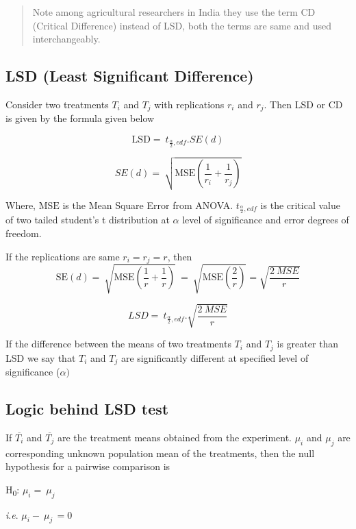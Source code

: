 \documentclass[
]{book}
\begin{document}
\begin{quote}
Note among agricultural researchers in India they use the term CD (Critical Difference) instead of LSD, both the terms are same and used interchangeably.
\end{quote}

\hypertarget{lsd-least-significant-difference}{%
\subsection{LSD (Least Significant Difference)}\label{lsd-least-significant-difference}}

Consider two treatments \(T_{i}\) and \(T_{j}\) with replications \(r_{i}\)
and \(r_{j}\). Then LSD or CD is given by the formula given below

\[\text{LSD} = \ t_{\frac{\alpha}{2},edf}.SE(d)\]

\[SE(d) = \ \sqrt{\text{MSE}\left( \frac{1}{r_{i}} + \frac{1}{r_{j}} \right)}\]

Where, \(\text{MSE}\) is the Mean Square Error from ANOVA.
\(t_{\frac{\alpha}{2},edf}\) is the critical value of two tailed student's t distribution at \(\alpha\) level of significance and error degrees of
freedom.

If the replications are same \(r_{i} = r_{j} = r\), then \[\text{SE}\left( d \right) = \ \sqrt{\text{MSE}\left( \frac{1}{r} + \frac{1}{r} \right)}\  = \ \sqrt{\text{MSE}\left( \frac{2}{r} \right)} = \sqrt{\frac{2\ MSE}{r}}\]

\[LSD = \ t_{\frac{\alpha}{2},edf}.\sqrt{\frac{2\ MSE}{r}}\]

If the difference between the means of two treatments \(T_{i}\) and \(T_{j}\) is greater than LSD we say that \(T_{i}\) and \(T_{j}\) are significantly different at specified level of significance (\(\alpha)\)

\hypertarget{logic-behind-lsd-test}{%
\subsection{Logic behind LSD test}\label{logic-behind-lsd-test}}

If \(\overline{T_{i}}\) and \(\overline{T_{j}}\) are the treatment means obtained from the experiment. \(\mu_{i}\) and \(\mu_{j}\) are corresponding unknown population mean of the treatments, then the null hypothesis for a pairwise comparison is

H\textsubscript{0}: \(\mu_{i} = \ \mu_{j}\)

\emph{i}.\emph{e}. \(\mu_{i} - \ \mu_{j\ } = 0\)
\end{document}
